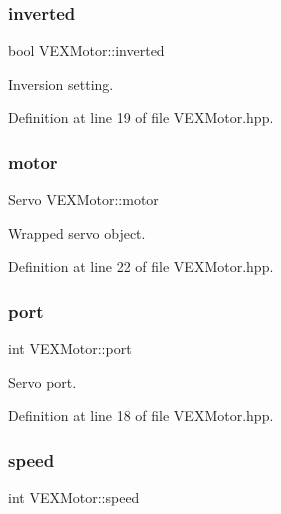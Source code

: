 \subsubsection{\texorpdfstring{inverted}{inverted}}
{\footnotesize\ttfamily bool V\+E\+X\+Motor\+::inverted\hspace{0.3cm}{\ttfamily [private]}}



Inversion setting. 



Definition at line 19 of file V\+E\+X\+Motor.\+hpp.

\mbox{\label{class_v_e_x_motor_a6cc23059af5cd57eafe31c900698d1a1}} 
\subsubsection{\texorpdfstring{motor}{motor}}
{\footnotesize\ttfamily Servo V\+E\+X\+Motor\+::motor\hspace{0.3cm}{\ttfamily [private]}}



Wrapped servo object. 



Definition at line 22 of file V\+E\+X\+Motor.\+hpp.

\mbox{\label{class_v_e_x_motor_a4d116557bd4fd7149a498980369bace5}} 
\subsubsection{\texorpdfstring{port}{port}}
{\footnotesize\ttfamily int V\+E\+X\+Motor\+::port\hspace{0.3cm}{\ttfamily [private]}}



Servo port. 



Definition at line 18 of file V\+E\+X\+Motor.\+hpp.

\mbox{\label{class_v_e_x_motor_a6ab8752bef90d706c107826a436afa24}} 
\subsubsection{\texorpdfstring{speed}{speed}}
{\footnotesize\ttfamily int V\+E\+X\+Motor\+::speed\hspace{0.3cm}{\ttfamily [private]}}



